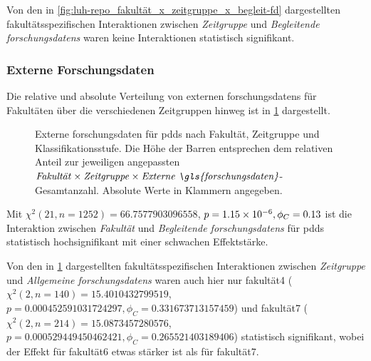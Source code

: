 Von den in \cref{fig:luh-repo_fakultät_x_zeitgruppe_x_begleit-fd} dargestellten fakultätsspezifischen Interaktionen zwischen \textit{Zeitgruppe} und \textit{Begleitende \glspl{forschungsdaten}} waren keine Interaktionen statistisch signifikant.

\subsubsection{Externe Forschungsdaten}
Die relative und absolute Verteilung von externen \glspl{forschungsdaten} für Fakultäten über die verschiedenen Zeitgruppen hinweg ist in \cref{fig:luh-repo_fakultät_x_zeitgruppe_x_externe-fd} dargestellt.
\begin{figure}[!htbp]
    \resizebox{\ifdim\width>\textwidth\textwidth\else\width\fi}{!}{}
    \caption{Externe \gls{forschungsdaten} für \glspl{pdd} nach Fakultät, Zeitgruppe und Klassifikationsstufe.
    Die Höhe der Barren entsprechen dem relativen Anteil zur jeweiligen angepassten $\text{\textit{Fakultät}}\times\text{\textit{Zeitgruppe}}\times\text{\textit{Externe \gls{forschungsdaten}}}$-Gesamtanzahl.
    Absolute Werte in Klammern angegeben.}
    \label{fig:luh-repo_fakultät_x_zeitgruppe_x_externe-fd}
\end{figure}
Mit $\chi^2 (\num{21}, n=\num{1252}) = \num[round-mode=places,round-precision=2]{66.7577903096558}$, $p = \num[round-mode=places,round-precision=2]{1.1517458402742E-06},\phi_C=\num[round-mode=places,round-precision=2]{0.133317814235608}$ ist die Interaktion zwischen \textit{Fakultät} und \textit{Begleitende \glspl{forschungsdaten}} für \glspl{pdd} statistisch hochsignifikant mit einer schwachen Effektstärke.

Von den in \cref{fig:luh-repo_fakultät_x_zeitgruppe_x_externe-fd} dargestellten fakultätsspezifischen Interaktionen zwischen \textit{Zeitgruppe} und \textit{Allgemeine \glspl{forschungsdaten}} waren auch hier nur \gls{fakultät4} ($\chi^2 (\num{2}, n=\num{140}) = \num[round-mode=places,round-precision=2]{15.4010432799519}$, $p = \num[round-mode=places,round-precision=4]{0.000452591031724297},\phi_C=\num[round-mode=places,round-precision=2]{0.331673713157459}$) und \gls{fakultät7} ($\chi^2 (\num{2}, n=\num{214}) = \num[round-mode=places,round-precision=2]{15.0873457280576}$, $p = \num[round-mode=places,round-precision=3]{0.000529449450462421},\phi_C=\num[round-mode=places,round-precision=2]{0.265521403189406}$) statistisch signifikant, wobei der Effekt für \gls{fakultät6} etwas stärker ist als für \gls{fakultät7}.

